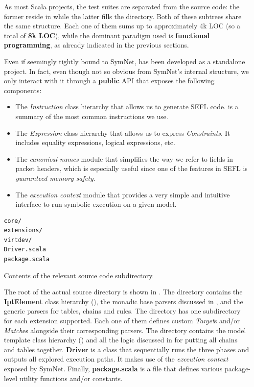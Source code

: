 As most Scala projects, the test suites are separated from the source code: the
former reside in  while the latter fills the 
directory.  Both of these subtrees share the same structure.  Each one of them
sums up to approximately 4k LOC (so a total of \textbf{8k LOC}), while the
dominant paradigm used is \textbf{functional programming}, as already indicated
in the previous sections.

Even if seemingly tightly bound to SymNet, \TOOL has been developed as a
standalone project.  In fact, even though not so obvious from SymNet's internal
structure, we only interact with it through a \textbf{public}
API that exposes the following
components:
\begin{itemize}
  \item The \emph{Instruction} class hierarchy that allows us to generate SEFL
    code.   is a summary of the most
    common instructions we use.
  \item The \emph{Expression} class hierarchy that allows us to express
    \emph{Constraints}.  It includes equality expressions, logical expressions,
    etc.
  \item The \emph{canonical names} module that simplifies the way we refer to
    fields in packet headers, which is especially useful since one of the
    features in SEFL is \emph{guaranteed memory safety}.
  \item The \emph{execution context} module that provides a very simple and
    intuitive interface to run symbolic execution on a given model.
\end{itemize}

\begin{listing}
  \lstset{numbers=none, frame=single, basicstyle=\ttfamily,
    xleftmargin=0.30\textwidth, xrightmargin=0.30\textwidth
  }
  \begin{lstlisting}
core/
extensions/
virtdev/
Driver.scala
package.scala
  \end{lstlisting}
  \caption{Contents of the relevant source code subdirectory.}
  \label{lst:root-directory}
\end{listing}

The root of the actual source directory is shown in
.  The  directory
contains the \textbf{IptElement} class hierarchy
(), the monadic base parsers discussed
in , and the generic parsers for tables,
chains and rules.  The  directory has one subdirectory for
each extension supported.  Each one of them defines custom \emph{Target}s
and/or \emph{Match}es alongside their corresponding parsers.  The
 directory contains the model template class hierarchy
() and all the logic discussed in
 for putting all chains and tables
together.  \textbf{Driver} is a class that sequentially runs the three phases
and outputs all explored execution paths.  It makes use of the \emph{execution
context} exposed by SymNet.  Finally, \textbf{package.scala} is a file that
defines various package-level utility functions and/or constants.
